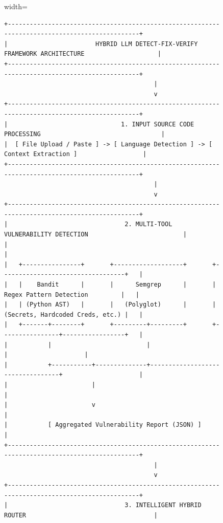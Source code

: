 \documentclass[conference]{IEEEtran}
\begin{document}
\begin{figure}[t]
\centering
\begin{adjustbox}{width=\textwidth}
\begin{small}
\begin{verbatim}
+-----------------------------------------------------------------------------------------------+
|                        HYBRID LLM DETECT-FIX-VERIFY FRAMEWORK ARCHITECTURE                    |
+-----------------------------------------------------------------------------------------------+
                                         |
                                         v
+-----------------------------------------------------------------------------------------------+
|                               1. INPUT SOURCE CODE PROCESSING                                 |
|  [ File Upload / Paste ] -> [ Language Detection ] -> [ Context Extraction ]                  |
+-----------------------------------------------------------------------------------------------+
                                         |
                                         v
+-----------------------------------------------------------------------------------------------+
|                                2. MULTI-TOOL VULNERABILITY DETECTION                          |
|                                                                                               |
|   +----------------+       +-------------------+       +----------------------------------+   |
|   |    Bandit      |       |      Semgrep      |       |  Regex Pattern Detection         |   |
|   | (Python AST)   |       |   (Polyglot)      |       | (Secrets, Hardcoded Creds, etc.) |   |
|   +-------+--------+       +---------+---------+       +----------------+-----------------+   |
|           |                          |                                  |                     |
|           +-----------+--------------+----------------------------------+                     |
|                       |                                                                       |
|                       v                                                                       |
|           [ Aggregated Vulnerability Report (JSON) ]                                          |
+-----------------------------------------------------------------------------------------------+
                                         |
                                         v
+-----------------------------------------------------------------------------------------------+
|                                3. INTELLIGENT HYBRID ROUTER                                   |

\end{verbatim}
\end{small}
\end{adjustbox}
\end{figure}
\end{document}

